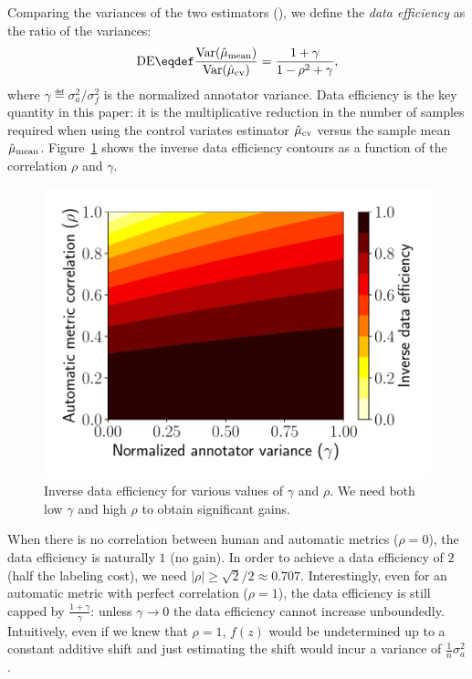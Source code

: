 Comparing the variances of the two estimators (),
we define the \emph{data efficiency} as the ratio of the variances:
\begin{align}
\DE \eqdef \frac{\Var(\musimple)}{\Var(\mucontrol)} = \frac{1 + \gamma}{1-\rho^2 + \gamma},
\end{align}
where $\gamma \eqdef \sigma^2_a / \sigma^2_f$ is the normalized annotator variance.
Data efficiency is the key quantity in this paper:
  it is the multiplicative reduction in the number of samples required
  when using the control variates estimator $\hat \mu_\text{cv}$ versus the sample mean $\hat \mu_\text{mean}$.
Figure~\ref{fig:savings} shows the inverse data efficiency contours as a function of the correlation $\rho$
and $\gamma$.

\begin{figure}
\centering
  \includegraphics[width=\columnwidth]{figures/savings}
  \caption{\label{fig:savings} Inverse data efficiency for various values of
  $\gamma$ and $\rho$.  We need both low $\gamma$ and high $\rho$ to obtain
  significant gains.
  }
\end{figure}

When there is no correlation between human and automatic metrics ($\rho = 0$),
the data efficiency is naturally $1$ (no gain).
In order to achieve a data efficiency of
$2$ (half the labeling cost), we need $|\rho| \geq \sqrt{2}/2 \approx 0.707$.
Interestingly, even for an automatic metric with perfect correlation ($\rho=1$),
the data efficiency is still capped by $\frac{1 + \gamma}{\gamma}$:
unless $\gamma \to 0$ the data efficiency cannot increase unboundedly.
Intuitively, even
if we knew that $\rho=1$, $f(z)$ would be undetermined up to a
constant additive shift and just estimating the shift would incur a variance of $\frac{1}{n} \sigma_a^2$.

